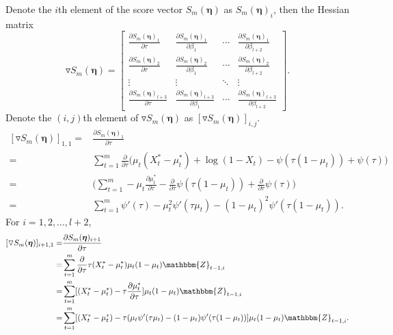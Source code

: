 \documentclass{article}
\theoremstyle{definition}
\begin{document}
Denote the $i$th element of the score vector $S_m(\bm{\eta})$ as $S_m(\bm{\eta})_i$, then the Hessian matrix 
\begin{equation*}
    \triangledown S_m(\bm{\eta}) = \begin{bmatrix} \frac{\partial S_m(\bm{\eta})_1}{\partial \tau} & \frac{\partial S_m(\bm{\eta})_1}{\partial \beta_1}& \cdots & \frac{\partial S_m(\bm{\eta})_1}{\partial \beta_{l+2}} \\
    \frac{\partial S_m(\bm{\eta})_2}{\partial \tau} & \frac{\partial S_m(\bm{\eta})_2}{\partial \beta_1} & \cdots & \frac{\partial S_m(\bm{\eta})_2}{\partial \beta_{l+2}} \\
    \vdots & \vdots & \ddots & \vdots \\
    \frac{\partial S_m(\bm{\eta})_{l+3}}{\partial \tau} & \frac{\partial S_m(\bm{\eta})_{l+3}}{\partial \beta_1}& \cdots & \frac{\partial S_m(\bm{\eta})_{l+3}}{\partial \beta_{l+2}}
\end{bmatrix}.
\end{equation*}
Denote the $(i,j)$th element of $\triangledown S_m(\bm{\eta})$ as $[\triangledown S_m(\bm{\eta})]_{i,j}$. 
\begin{equation*}
    \begin{aligned}
        [\triangledown S_m(\bm{\eta})]_{1,1} =& \frac{\partial S_m(\bm{\eta})_1}{\partial \tau} \\
        =& \sum_{t=1}^m \frac{\partial}{\partial \tau} \Big(\mu_t(X_t^*-\mu_t^*)+\log(1-X_t)-\psi(\tau(1-\mu_t))+\psi(\tau)\Big)\\
        =& \Big(\sum_{t=1}^m -\mu_t \frac{\partial \mu_t^*}{\partial \tau}-\frac{\partial}{\partial \tau} \psi(\tau(1-\mu_t))+\frac{\partial}{\partial \tau}\psi(\tau) \Big)\\
        =& \sum_{t=1}^m \psi'(\tau)-\mu_t^2 \psi'(\tau \mu_t)-(1-\mu_t)^2 \psi'(\tau(1-\mu_t)).
    \end{aligned}
\end{equation*}
For $i = 1,2,...,l+2$,
\begin{equation*}
    \begin{aligned}
        [\triangledown S_m(\bm{\eta})]_{i+1,1} =& \frac{\partial S_m(\bm{\eta})_{i+1}}{\partial \tau} \\
        =& \sum_{t=1}^m \frac{\partial}{\partial \tau}\tau(X_t^*-\mu_t^*)\mu_t(1-\mu_t) \mathbbm{Z}_{t-1,i} \\
        =& \sum_{t=1}^m [(X_t^*-\mu_t^*)-\tau\frac{\partial \mu_t^*}{\partial \tau}]\mu_t(1-\mu_t) \mathbbm{Z}_{t-1,i} \\
        =& \sum_{t=1}^m [(X_t^*-\mu_t^*)-\tau(\mu_t\psi'(\tau \mu_t)-(1-\mu_t)\psi'(\tau(1-\mu_t))]\mu_t(1-\mu_t) \mathbbm{Z}_{t-1,i}. \\
\end{aligned}
\end{equation*}
\end{document}
